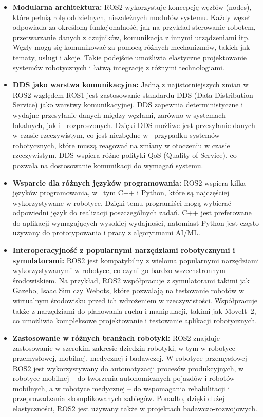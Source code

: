 \documentclass[12pt]{article}
\begin{document}
\begin{itemize}
    \item \textbf{Modularna architektura:} ROS2 wykorzystuje koncepcję węzłów (nodes), które pełnią rolę oddzielnych, niezależnych modułów systemu. Każdy węzeł odpowiada za określoną funkcjonalność, jak na przykład sterowanie robotem, przetwarzanie danych z czujników, komunikacja z innymi urządzeniami itp. Węzły mogą się komunikować za pomocą różnych mechanizmów, takich jak tematy, usługi i akcje. Takie podejście umożliwia elastyczne projektowanie systemów robotycznych i łatwą integrację z różnymi technologiami.
    
    \item \textbf{DDS jako warstwa komunikacyjna:} Jedną z najistotniejszych zmian w ROS2 względem ROS1 jest zastosowanie standardu DDS (Data Distribution Service) jako warstwy komunikacyjnej. DDS zapewnia deterministyczne i wydajne przesyłanie danych między węzłami, zarówno w systemach lokalnych, jak i~ rozproszonych. Dzięki DDS możliwe jest przesyłanie danych w czasie rzeczywistym, co jest niezbędne w~ przypadku systemów robotycznych, które muszą reagować na zmiany w otoczeniu w czasie rzeczywistym. DDS wspiera różne polityki QoS (Quality of Service), co pozwala na dostosowanie komunikacji do wymagań systemu.
    
    \item \textbf{Wsparcie dla różnych języków programowania:} ROS2 wspiera kilka języków programowania, w~ tym C++ i Python, które są najczęściej wykorzystywane w robotyce. Dzięki temu programiści mogą wybierać odpowiedni język do realizacji poszczególnych zadań. C++ jest preferowane do aplikacji wymagających wysokiej wydajności, natomiast Python jest często używany do prototypowania i pracy z algorytmami AI/ML.
    
    \item \textbf{Interoperacyjność z popularnymi narzędziami robotycznymi i symulatorami:} ROS2 jest kompatybilny z wieloma popularnymi narzędziami wykorzystywanymi w robotyce, co czyni go bardzo wszechstronnym środowiskiem. Na przykład, ROS2 współpracuje z symulatorami takimi jak Gazebo, Isaac Sim czy Webots, które pozwalają na testowanie robotów w wirtualnym środowisku przed ich wdrożeniem w rzeczywistości. Współpracuje także z narzędziami do planowania ruchu i manipulacji, takimi jak MoveIt~2, co umożliwia kompleksowe projektowanie i testowanie aplikacji robotycznych.
    
    \item \textbf{Zastosowanie w różnych branżach robotyki:} ROS2 znajduje zastosowanie w szerokim zakresie dziedzin robotyki, w tym w robotyce przemysłowej, mobilnej, medycznej i badawczej. W robotyce przemysłowej ROS2 jest wykorzystywany do automatyzacji procesów produkcyjnych, w robotyce mobilnej – do tworzenia autonomicznych pojazdów i robotów mobilnych, a w robotyce medycznej – do wspomagania rehabilitacji i przeprowadzania skomplikowanych zabiegów. Ponadto, dzięki dużej elastyczności, ROS2 jest używany także w projektach badawczo-rozwojowych.
    

\end{itemize}
\end{document}

